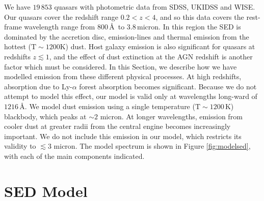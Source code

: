 We have $19\,853$ quasars with photometric data from SDSS, UKIDSS and WISE. 
Our quasars cover the redshift range $0.2 < z < 4$, and so this data covers the rest-frame wavelength range from $800$\,\AA\, to $3.8$\,micron. 
In this region the SED is dominated by the accretion disc, emission-lines and thermal emission from the hottest (${\mathrm T}\sim1200$K) dust. 
Host galaxy emission is also significant for quasars at redshifts $z\lesssim1$, and the effect of dust extinction at the AGN redshift is another factor which must be considered.   
In this Section, we describe how we have modelled emission from these different physical processes.
At high redshifts, absorption due to Ly-$\alpha$ forest absorption becomes significant. 
Because we do not attempt to model this effect, our model is valid only at wavelengths long-ward of $1216$\,\AA. 
We model dust emission using a single temperature (${\mathrm T}\sim1200$\,K) blackbody, which peaks at $\sim2$ micron. 
At longer wavelengths, emission from cooler dust at greater radii from the central engine becomes increasingly important. 
We do not include this emission in our model, which restricts its validity to $\lesssim3$ micron.
The model spectrum is shown in Figure \ref{fig:modelsed}, with each of the main components indicated. 

\section{SED Model}

